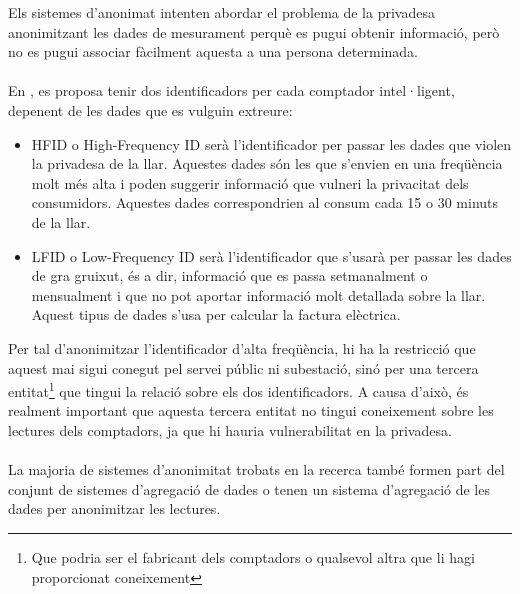 
Els sistemes d'anonimat intenten abordar el problema de la privadesa anonimitzant les dades de mesurament perquè es pugui obtenir informació, però no es pugui associar fàcilment aquesta a una persona determinada.
\\\\
En \cite{anonimity}, es proposa tenir dos identificadors per cada comptador intel·ligent, depenent de les dades que es vulguin extreure:
\begin{itemize}
	\item HFID o High-Frequency ID serà l'identificador per passar les dades que violen la privadesa de la llar. Aquestes dades són les que s'envien en una freqüència molt més alta i poden suggerir informació que vulneri la privacitat dels consumidors. Aquestes dades correspondrien al consum cada 15 o 30 minuts de la llar.
	\item LFID o Low-Frequency ID serà l'identificador que s'usarà per passar les dades de gra gruixut, és a dir, informació que es passa setmanalment o mensualment i que no pot aportar informació molt detallada sobre la llar. Aquest tipus de dades s'usa per calcular la factura elèctrica.
\end{itemize}
Per tal d'anonimitzar l'identificador d'alta freqüència, hi ha la restricció que aquest mai sigui conegut pel servei públic ni subestació, sinó per una tercera entitat\footnote{Que podria ser el fabricant dels comptadors o qualsevol altra que li hagi proporcionat coneixement} que tingui la relació sobre els dos identificadors. A causa d'això, és realment important que aquesta tercera entitat no tingui coneixement sobre les lectures dels comptadors, ja que hi hauria vulnerabilitat en la privadesa.
\\
\\
La majoria de sistemes d'anonimitat trobats en la recerca també formen part del conjunt de sistemes d'agregació de dades o tenen un sistema d'agregació de les dades per anonimitzar les lectures.
